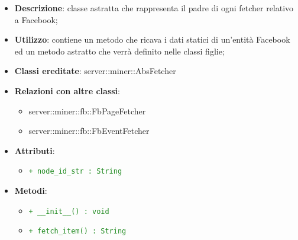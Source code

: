			\begin{itemize}
				\item \textbf{Descrizione}: classe astratta che rappresenta il padre di ogni fetcher relativo a Facebook;
				\item \textbf{Utilizzo}: contiene un metodo che ricava i dati statici di un'entità Facebook ed un metodo astratto che verrà definito nelle classi figlie;
				\item \textbf{Classi ereditate}: server::miner::AbsFetcher
				\item \textbf{Relazioni con altre classi}:
					\begin{itemize}
						\item server::miner::fb::FbPageFetcher
						\item server::miner::fb::FbEventFetcher
					\end{itemize}
				\item \textbf{Attributi}: 
					\begin{itemize}
						\item \textcolor{forestgreen}{\texttt{+ node\_id\_str : String}}
					\end{itemize}
				\item \textbf{Metodi}:   
					\begin{itemize}
						\item \textcolor{forestgreen}{\texttt{+ \_\_init\_\_() : void}}
						\item \textcolor{forestgreen}{\texttt{+ fetch\_item() : String}}
					\end{itemize}
			\end{itemize}

